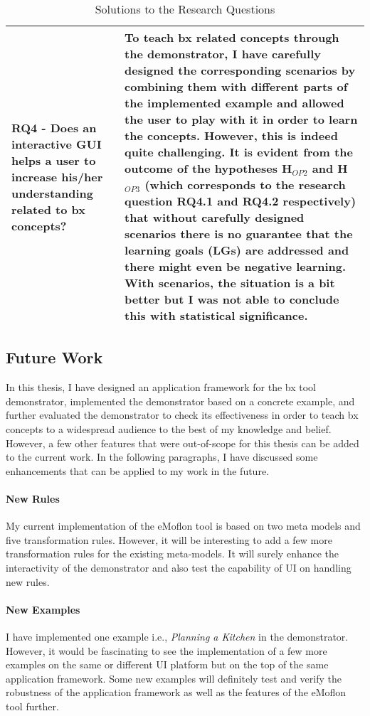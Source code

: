 \begin{table}
	\begin{tabular}{|p{5cm}|p{9.5cm}|}
		\hline	
		\textbf{RQ4 -} Does an interactive GUI helps a user to increase his/her understanding related to bx concepts? &
		To teach bx related concepts through the demonstrator, I have carefully designed the corresponding scenarios by combining them with different parts of the implemented example and allowed the user to play with it in order to learn the concepts. However, this is indeed quite challenging. It is evident from the outcome of the hypotheses H$_{OP2}$ and H$_{OP3}$ (which corresponds to the research question \textbf{RQ4.1} and \textbf{RQ4.2} respectively) that without carefully designed scenarios there is no guarantee that the learning goals (\textbf{LG}s) are addressed and there might even be negative learning. With scenarios, the situation is a bit better but I was not able to conclude this with statistical significance.\\
		\hline			
	\end{tabular}
	\caption{Solutions to the Research Questions}
	\label{tab:Solutions_ResearchQuestions}
\end{table}

\subsection{Future Work}\label{subsec:futurework}
In this thesis, I have designed an application framework for the bx tool demonstrator, implemented the demonstrator based on a concrete example, and further evaluated the demonstrator to check its effectiveness in order to teach bx concepts to a widespread audience to the best of my knowledge and belief. However, a few other features that were out-of-scope for this thesis can be added to the current work. In the following paragraphs, I have discussed some enhancements that can be applied to my work in the future.
 
\paragraph{New Rules}
My current implementation of the eMoflon tool is based on two meta models and five transformation rules. However, it will be interesting to add a few more transformation rules for the existing meta-models. It will surely enhance the interactivity of the demonstrator and also test the capability of UI on handling new rules.

\paragraph{New Examples} I have implemented one example i.e., \textit{Planning a Kitchen} in the demonstrator. However, it would be fascinating to see the implementation of a few more examples on the same or different UI platform but on the top of the same application framework. Some new examples will definitely test and verify the robustness of the application framework as well as the features of the eMoflon tool further.


